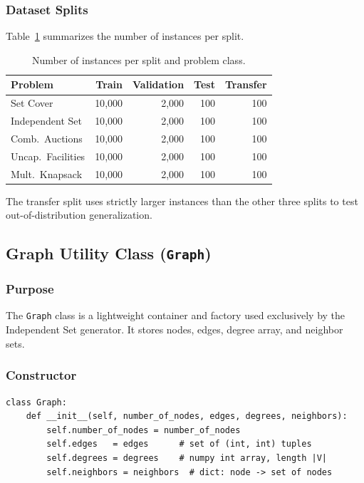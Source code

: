 \subsubsection{Dataset Splits}

Table~\ref{tab:splits} summarizes the number of instances per split.

\begin{table}[h]
\centering
\caption{Number of instances per split and problem class.}
\label{tab:splits}
\begin{tabular}{lrrrr}
\toprule
Problem & Train & Validation & Test & Transfer \\
\midrule
Set Cover          & 10{,}000 & 2{,}000 & 100 & 100 \\
Independent Set    & 10{,}000 & 2{,}000 & 100 & 100 \\
Comb.\ Auctions    & 10{,}000 & 2{,}000 & 100 & 100 \\
Uncap.\ Facilities & 10{,}000 & 2{,}000 & 100 & 100 \\
Mult.\ Knapsack    & 10{,}000 & 2{,}000 & 100 & 100 \\
\bottomrule
\end{tabular}
\end{table}

The transfer split uses strictly larger instances than the other three splits to test out-of-distribution generalization.

\subsection{Graph Utility Class (\texttt{Graph})}

\subsubsection{Purpose}

The \texttt{Graph} class is a lightweight container and factory used exclusively by the Independent Set generator. It stores nodes, edges, degree array, and neighbor sets.

\subsubsection{Constructor}

\begin{lstlisting}
class Graph:
    def __init__(self, number_of_nodes, edges, degrees, neighbors):
        self.number_of_nodes = number_of_nodes
        self.edges   = edges      # set of (int, int) tuples
        self.degrees = degrees    # numpy int array, length |V|
        self.neighbors = neighbors  # dict: node -> set of nodes
\end{lstlisting}

